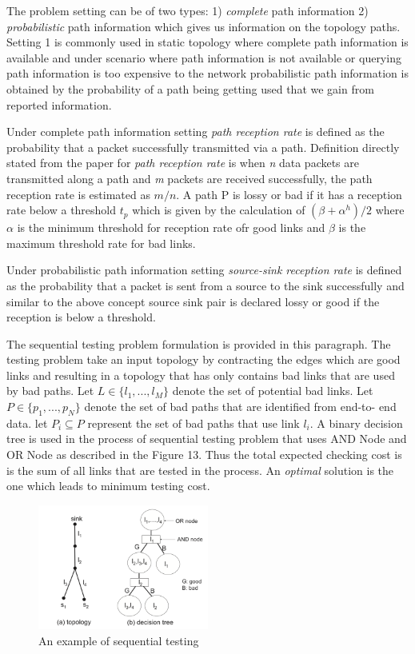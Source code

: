 \documentclass[10pt]{sigplan-proc-varsize}
\begin{document}
The problem setting can be of two types: 1) {\it complete}  path information 2) {\it probabilistic} path information which gives us information on the topology paths. Setting 1 is commonly used in static topology where complete path information is available and under scenario where path information is not available or querying path information is too expensive to the network probabilistic path  information is obtained by the probability of a path being getting used that we gain from reported information. 

Under complete path information setting {\it path reception rate} is defined as the probability that a packet successfully transmitted via a path.  Definition directly stated from the paper \cite{krishna:12} for {\it path reception rate} is when {\it n} data packets are transmitted along a path and {\it m} packets are received successfully, the path reception rate is estimated as {\it $m/n$}. A path P is lossy or bad if it has a reception rate below a threshold $t_p$ which is given by the calculation of $(\beta+\alpha^h)/2$ where $\alpha$ is the minimum threshold for reception rate ofr good links and $\beta$ is the maximum threshold rate for bad links.

Under probabilistic path information setting {\it source-sink reception rate} is defined as the probability that a packet is sent from a source to the sink successfully and similar to the above concept source sink pair is declared lossy or good if the reception is below a threshold. 

The sequential testing problem formulation is provided in this paragraph. The testing problem take an input topology by contracting the edges which are good links and resulting in a topology that has only contains bad links that are used by bad paths. Let {\it $L \in  \{l_1,...,l_M\}$} denote the set of potential bad links. Let {\it $P \in  \{p_1,...,p_N\}$} denote the set of bad paths that are identified from end-to- end data. let $P_i \subseteq P$ represent the set of bad paths that use link $l_i$. A binary decision tree is used in the process of sequential testing problem that uses AND Node and OR Node as described in the Figure 13. Thus the total expected checking cost is is the sum of all links that are tested in the process. An {\it optimal} solution is the one which leads to minimum testing cost.

\begin{figure}[h!]
  \caption{An example of sequential testing}
  \centering
    \includegraphics[width=0.5\textwidth]{Fig15}
\end{figure}
\end{document}
